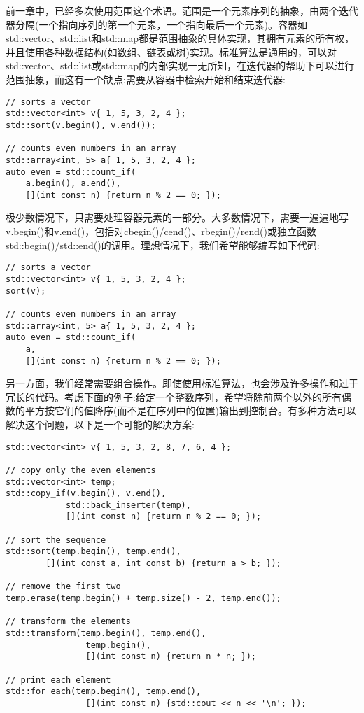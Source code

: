 前一章中，已经多次使用范围这个术语。范围是一个元素序列的抽象，由两个迭代器分隔(一个指向序列的第一个元素，一个指向最后一个元素)。容器如std::vector、std::list和std::map都是范围抽象的具体实现，其拥有元素的所有权，并且使用各种数据结构(如数组、链表或树)实现。标准算法是通用的，可以对std::vector、std::list或std::map的内部实现一无所知，在迭代器的帮助下可以进行范围抽象，而这有一个缺点:需要从容器中检索开始和结束迭代器:

\begin{lstlisting}[style=styleCXX]
// sorts a vector
std::vector<int> v{ 1, 5, 3, 2, 4 };
std::sort(v.begin(), v.end());

// counts even numbers in an array
std::array<int, 5> a{ 1, 5, 3, 2, 4 };
auto even = std::count_if(
	a.begin(), a.end(),
	[](int const n) {return n % 2 == 0; });
\end{lstlisting}

极少数情况下，只需要处理容器元素的一部分。大多数情况下，需要一遍遍地写v.begin()和v.end()，包括对cbegin()/cend()、rbegin()/rend()或独立函数std::begin()/std::end()的调用。理想情况下，我们希望能够编写如下代码:

\begin{lstlisting}[style=styleCXX]
// sorts a vector
std::vector<int> v{ 1, 5, 3, 2, 4 };
sort(v);

// counts even numbers in an array
std::array<int, 5> a{ 1, 5, 3, 2, 4 };
auto even = std::count_if(
	a,
	[](int const n) {return n % 2 == 0; });
\end{lstlisting}

另一方面，我们经常需要组合操作。即使使用标准算法，也会涉及许多操作和过于冗长的代码。考虑下面的例子:给定一个整数序列，希望将除前两个以外的所有偶数的平方按它们的值降序(而不是在序列中的位置)输出到控制台。有多种方法可以解决这个问题，以下是一个可能的解决方案:

\begin{lstlisting}[style=styleCXX]
std::vector<int> v{ 1, 5, 3, 2, 8, 7, 6, 4 };

// copy only the even elements
std::vector<int> temp;
std::copy_if(v.begin(), v.end(),
			std::back_inserter(temp),
			[](int const n) {return n % 2 == 0; });
			
// sort the sequence
std::sort(temp.begin(), temp.end(),
		[](int const a, int const b) {return a > b; });
		
// remove the first two
temp.erase(temp.begin() + temp.size() - 2, temp.end());

// transform the elements
std::transform(temp.begin(), temp.end(),
				temp.begin(),
				[](int const n) {return n * n; });

// print each element
std::for_each(temp.begin(), temp.end(),
				[](int const n) {std::cout << n << '\n'; });
\end{lstlisting}

